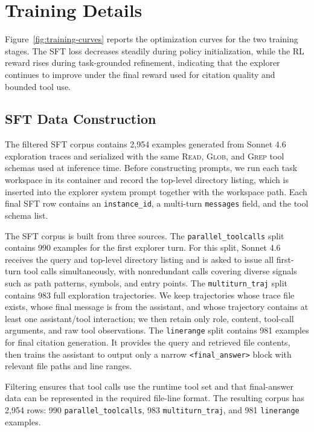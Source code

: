 
\appendix


\section{Training Details}
\label{app:training-details}

Figure~\ref{fig:training-curves} reports the optimization curves for the two training stages.
The SFT loss decreases steadily during policy initialization, while the RL reward rises during task-grounded refinement, indicating that the explorer continues to improve under the final reward used for citation quality and bounded tool use.


\subsection{SFT Data Construction}
\label{app:sft-data}

The filtered SFT corpus contains 2,954 examples generated from Sonnet 4.6 exploration traces and serialized with the same \textsc{Read}, \textsc{Glob}, and \textsc{Grep} tool schemas used at inference time.
Before constructing prompts, we run each task workspace in its container and record the top-level directory listing, which is inserted into the explorer system prompt together with the workspace path.
Each final SFT row contains an \texttt{instance\_id}, a multi-turn \texttt{messages} field, and the tool schema list.

The SFT corpus is built from three sources.
The \texttt{parallel\_toolcalls} split contains 990 examples for the first explorer turn.
For this split, Sonnet 4.6 receives the query and top-level directory listing and is asked to issue all first-turn tool calls simultaneously, with nonredundant calls covering diverse signals such as path patterns, symbols, and entry points.
The \texttt{multiturn\_traj} split contains 983 full exploration trajectories.
We keep trajectories whose trace file exists, whose final message is from the assistant, and whose trajectory contains at least one assistant/tool interaction; we then retain only role, content, tool-call arguments, and raw tool observations.
The \texttt{linerange} split contains 981 examples for final citation generation.
It provides the query and retrieved file contents, then trains the assistant to output only a narrow \texttt{<final\_answer>} block with relevant file paths and line ranges.

Filtering ensures that tool calls use the runtime tool set and that final-answer data can be represented in the required file-line format.
The resulting corpus has 2,954 rows: 990 \texttt{parallel\_toolcalls}, 983 \texttt{multiturn\_traj}, and 981 \texttt{linerange} examples.

